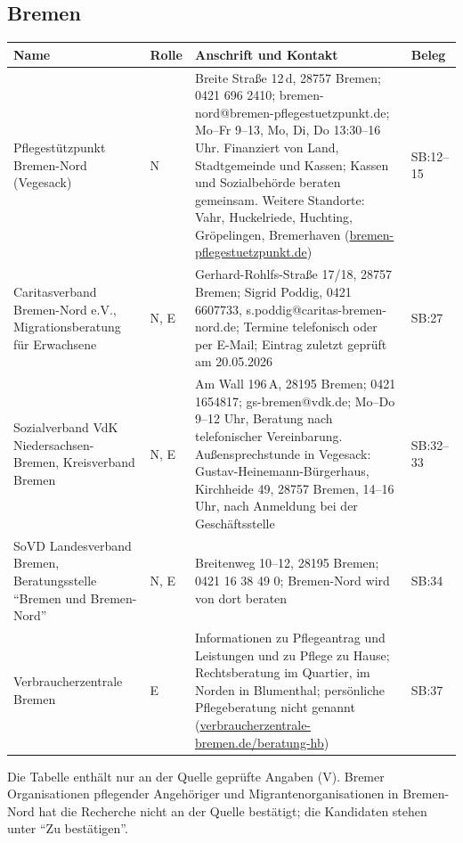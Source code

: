 \documentclass[10pt,parskip=half-]{scrartcl}
\begin{document}
\subsection{Bremen}

{\footnotesize\setlength{\tabcolsep}{3pt}
\begin{longtable}{@{}P{36mm}P{9mm}P{90mm}P{16mm}@{}}
\toprule
\textbf{Name} & \textbf{Rolle} & \textbf{Anschrift und Kontakt} & \textbf{Beleg}\\
\midrule
\endhead
Pflegestützpunkt Bremen-Nord (Vegesack) & N & Breite Straße 12\,d, 28757 Bremen; 0421 696 2410;
  bremen-nord@bremen-pflegestuetzpunkt.de; Mo--Fr 9--13, Mo, Di, Do 13:30--16 Uhr. Finanziert von
  Land, Stadtgemeinde und Kassen; Kassen und Sozialbehörde beraten gemeinsam. Weitere Standorte:
  Vahr, Huckelriede, Huchting, Gröpelingen, Bremerhaven
  (\href{http://www.bremen-pflegestuetzpunkt.de}{bremen-pflegestuetzpunkt.de}) & SB:12--15 \\
Caritasverband Bremen-Nord e.V., Migrationsberatung für Erwachsene & N, E & Gerhard-Rohlfs-Straße
  17/18, 28757 Bremen; Sigrid Poddig, 0421 6607733, s.poddig@caritas-bremen-nord.de; Termine
  telefonisch oder per E-Mail; Eintrag zuletzt geprüft am 20.05.2026 & SB:27 \\
Sozialverband VdK Niedersachsen-Bremen, Kreisverband Bremen & N, E & Am Wall 196\,A, 28195
  Bremen; 0421 1654817; gs-bremen@vdk.de; Mo--Do 9--12 Uhr, Beratung nach telefonischer
  Vereinbarung. Außensprechstunde in Vegesack: Gustav-Heinemann-Bürgerhaus, Kirchheide 49, 28757
  Bremen, 14--16 Uhr, nach Anmeldung bei der Geschäftsstelle & SB:32--33 \\
SoVD Landesverband Bremen, Beratungsstelle \enquote{Bremen und Bremen-Nord} & N, E &
  Breitenweg 10--12, 28195 Bremen; 0421 16 38 49 0; Bremen-Nord wird von dort beraten & SB:34 \\
Verbraucherzentrale Bremen & E & Informationen zu Pflegeantrag und Leistungen und zu Pflege zu
  Hause; Rechtsberatung im Quartier, im Norden in Blumenthal; persönliche Pflegeberatung nicht
  genannt (\href{https://www.verbraucherzentrale-bremen.de/beratung-hb}{verbraucherzentrale-bremen.de/beratung-hb}) & SB:37 \\
\bottomrule
\end{longtable}
}

Die Tabelle enthält nur an der Quelle geprüfte Angaben (V). Bremer Organisationen pflegender
Angehöriger und Migrantenorganisationen in Bremen-Nord hat die Recherche nicht an der Quelle
bestätigt; die Kandidaten stehen unter \enquote{Zu bestätigen}.
\end{document}
